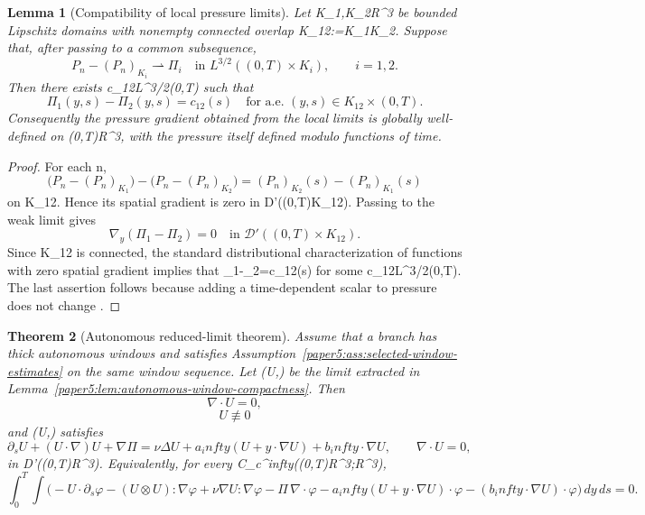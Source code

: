 \documentclass[11pt]{amsart}
\def\({}%
\def\){}%
\def\mathbb#1{#1}%
\def\infty{infty}%
\theoremstyle{plain}
\newtheorem{theorem}{Theorem}[section]
\newtheorem{lemma}[theorem]{Lemma}
\theoremstyle{definition}
\theoremstyle{remark}
\begin{document}
\begin{lemma}[Compatibility of local pressure limits]\label{paper5:lem:pressure-compatibility}
Let \(K_1,K_2\Subset\mathbb R^3\) be bounded Lipschitz domains with
nonempty connected overlap \(K_{12}:=K_1\cap K_2\).  Suppose that, after passing to a common
subsequence,
\[
  P_n-(P_n)_{K_i}\rightharpoonup \Pi_i
  \quad\text{in }L^{3/2}((0,T)\times K_i),
  \qquad i=1,2.
\]
Then there exists \(c_{12}\in L^{3/2}(0,T)\) such that
\[
  \Pi_1(y,s)-\Pi_2(y,s)=c_{12}(s)
  \quad\text{for a.e. }(y,s)\in K_{12}\times(0,T).
\]
Consequently the pressure gradient \(\nabla\Pi\) obtained from the local limits is globally
well-defined on \((0,T)\times\mathbb R^3\), with the pressure itself defined modulo functions
of time.
\end{lemma}

\begin{proof}
For each \(n\),
\[
  \bigl(P_n-(P_n)_{K_1}\bigr)-\bigl(P_n-(P_n)_{K_2}\bigr)
  =(P_n)_{K_2}(s)-(P_n)_{K_1}(s)
\]
on \(K_{12}\).  Hence its spatial gradient is zero in
\(\mathcal D'((0,T)\times K_{12})\).  Passing to the weak limit gives
\[
  \nabla_y(\Pi_1-\Pi_2)=0
  \quad\text{in }\mathcal D'((0,T)\times K_{12}).
\]
Since \(K_{12}\) is connected, the standard distributional characterization of functions with
zero spatial gradient implies that \(\Pi_1-\Pi_2=c_{12}(s)\) for some
\(c_{12}\in L^{3/2}(0,T)\).  The last assertion follows because adding a time-dependent scalar
to pressure does not change \(\nabla\Pi\).
\end{proof}

\begin{theorem}[Autonomous reduced-limit theorem]\label{paper5:thm:autonomous-limit}
Assume that a branch has thick autonomous windows and satisfies
Assumption~\ref{paper5:ass:selected-window-estimates} on the same window sequence.  Let
\((U,\Pi)\) be the limit extracted in Lemma~\ref{paper5:lem:autonomous-window-compactness}.  Then
\[
  \nabla\cdot U=0,
\]
\[
  U\not\equiv0
\]
and \((U,\Pi)\) satisfies
\begin{equation}\label{paper5:eq:autonomous-limit}
  \partial_sU+(U\cdot\nabla)U+\nabla\Pi
  =\nu\Delta U+a_\infty(U+y\cdot\nabla U)+b_\infty\cdot\nabla U,
  \qquad
  \nabla\cdot U=0,
\end{equation}
in \(\mathcal D'((0,T)\times\mathbb R^3)\).  Equivalently, for every
\(\varphi\in C_c^\infty((0,T)\times\mathbb R^3;\mathbb R^3)\),
\[
  \int_0^T\!\int
  \bigl(
  -U\cdot\partial_s\varphi
  -(U\otimes U):\nabla\varphi
  +\nu\nabla U:\nabla\varphi
  -\Pi\,\nabla\cdot\varphi
  -a_\infty(U+y\cdot\nabla U)\cdot\varphi
  -(b_\infty\cdot\nabla U)\cdot\varphi
  \bigr)\,dy\,ds=0.
\]
\end{theorem}
\end{document}
